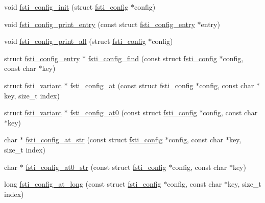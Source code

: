 \begin{DoxyCompactItemize}
\item 
void \mbox{\hyperlink{fsti-config_8c_abf23f5142b201c8f6e9db888be75f924}{fsti\+\_\+config\+\_\+init}} (struct \mbox{\hyperlink{structfsti__config}{fsti\+\_\+config}} $\ast$config)
\item 
void \mbox{\hyperlink{fsti-config_8c_acc33ddba0191f4d6013a23e52e0b16c2}{fsti\+\_\+config\+\_\+print\+\_\+entry}} (const struct \mbox{\hyperlink{structfsti__config__entry}{fsti\+\_\+config\+\_\+entry}} $\ast$entry)
\item 
void \mbox{\hyperlink{fsti-config_8c_a0ac007ff2f6adaabfb434a239cf36b6c}{fsti\+\_\+config\+\_\+print\+\_\+all}} (struct \mbox{\hyperlink{structfsti__config}{fsti\+\_\+config}} $\ast$config)
\item 
struct \mbox{\hyperlink{structfsti__config__entry}{fsti\+\_\+config\+\_\+entry}} $\ast$ \mbox{\hyperlink{fsti-config_8c_a83fb2b9e2caaf46ab1c6ff13c618718f}{fsti\+\_\+config\+\_\+find}} (const struct \mbox{\hyperlink{structfsti__config}{fsti\+\_\+config}} $\ast$config, const char $\ast$key)
\item 
struct \mbox{\hyperlink{structfsti__variant}{fsti\+\_\+variant}} $\ast$ \mbox{\hyperlink{fsti-config_8c_a7e65ede372ff1c72a9eb5e6c26f499e4}{fsti\+\_\+config\+\_\+at}} (const struct \mbox{\hyperlink{structfsti__config}{fsti\+\_\+config}} $\ast$config, const char $\ast$key, size\+\_\+t index)
\item 
struct \mbox{\hyperlink{structfsti__variant}{fsti\+\_\+variant}} $\ast$ \mbox{\hyperlink{fsti-config_8c_a720dc18f76126042749bd5bab32fcc14}{fsti\+\_\+config\+\_\+at0}} (const struct \mbox{\hyperlink{structfsti__config}{fsti\+\_\+config}} $\ast$config, const char $\ast$key)
\item 
char $\ast$ \mbox{\hyperlink{fsti-config_8c_aa51f915ff212933ab1b10a22b82b1464}{fsti\+\_\+config\+\_\+at\+\_\+str}} (const struct \mbox{\hyperlink{structfsti__config}{fsti\+\_\+config}} $\ast$config, const char $\ast$key, size\+\_\+t index)
\item 
char $\ast$ \mbox{\hyperlink{fsti-config_8c_a50a8eef9690263f45e229ce63cdefbfc}{fsti\+\_\+config\+\_\+at0\+\_\+str}} (const struct \mbox{\hyperlink{structfsti__config}{fsti\+\_\+config}} $\ast$config, const char $\ast$key)
\item 
long \mbox{\hyperlink{fsti-config_8c_a66e20fd6ac731a2183f5f303d9707058}{fsti\+\_\+config\+\_\+at\+\_\+long}} (const struct \mbox{\hyperlink{structfsti__config}{fsti\+\_\+config}} $\ast$config, const char $\ast$key, size\+\_\+t index)

\end{DoxyCompactItemize}
